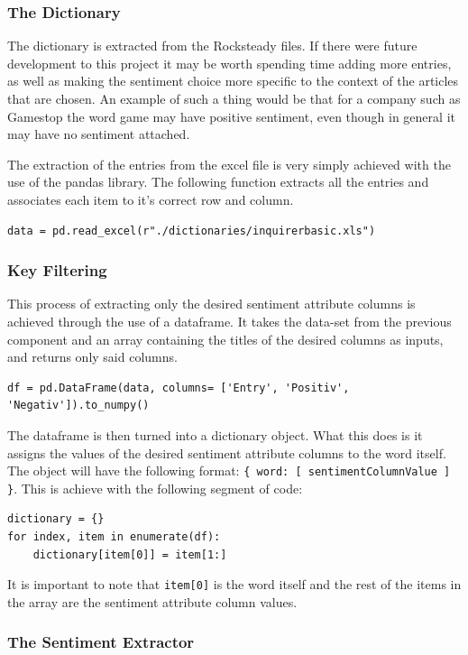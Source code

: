 \subsubsection{The Dictionary}

The dictionary is extracted from the Rocksteady files. If there were future development to this project it may be worth spending time adding more entries, as well as making the sentiment choice more specific to the context of the articles that are chosen. An example of such a thing would be that for a company such as Gamestop the word game may have positive sentiment, even though in general it may have no sentiment attached.

The extraction of the entries from the excel file is very simply achieved with the use of the pandas library. The following function extracts all the entries and associates each item to it's correct row and column.
\begin{lstlisting}[caption=Dictionary Extraction]
data = pd.read_excel(r"./dictionaries/inquirerbasic.xls") 
\end{lstlisting}

\subsubsection{Key Filtering}

This process of extracting only the desired sentiment attribute columns is achieved through the use of a dataframe. It takes the data-set from the previous component and an array containing the titles of the desired columns as inputs, and returns only said columns.
\begin{lstlisting}[caption=Key Filtering Dataframe]
df = pd.DataFrame(data, columns= ['Entry', 'Positiv', 'Negativ']).to_numpy()
\end{lstlisting}
The dataframe is then turned into a dictionary object. What this does is it assigns the values of the desired sentiment attribute columns to the word itself. The object will have the following format: \verb|{ word: [ sentimentColumnValue ] }|. This is achieve with the following segment of code:
\begin{lstlisting}[caption=Dictionary Creation]
dictionary = {}
for index, item in enumerate(df):
    dictionary[item[0]] = item[1:]
\end{lstlisting}
It is important to note that \verb|item[0]| is the word itself and the rest of the items in the array are the sentiment attribute column values.

\subsubsection{The Sentiment Extractor}

